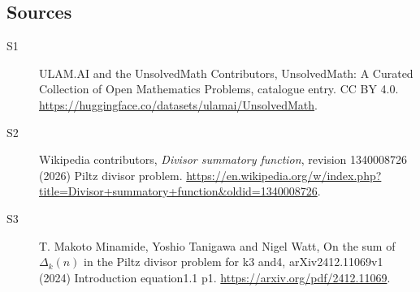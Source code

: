 \documentclass[11pt]{article}
\begin{document}
\subsection{Sources}
\begin{description}
\item[\hypertarget{source:statement:1}{S1}] ULAM.AI and the UnsolvedMath Contributors, UnsolvedMath: A Curated Collection of Open Mathematics Problems, catalogue entry. CC BY 4.0. \url{https://huggingface.co/datasets/ulamai/UnsolvedMath}.
\item[\hypertarget{source:statement:2}{S2}] Wikipedia contributors, \emph{Divisor summatory function}, revision 1340008726 (2026) Piltz divisor problem. \url{https://en.wikipedia.org/w/index.php?title=Divisor+summatory+function&oldid=1340008726}.
\item[\hypertarget{source:statement:3}{S3}] T. Makoto Minamide, Yoshio Tanigawa and Nigel Watt, On the sum of $\Delta_k(n)$ in the Piltz divisor problem for k3 and4, arXiv2412.11069v1 (2024) Introduction equation1.1 p1. \url{https://arxiv.org/pdf/2412.11069}.
\end{description}
\label{end:statement}
\end{document}

